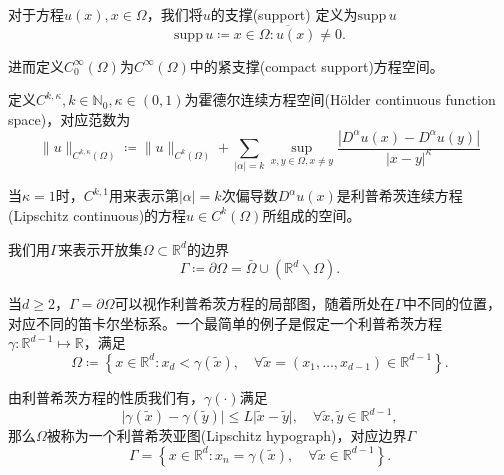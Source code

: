 对于方程$u(x), x \in \Omega$，我们将$u$的支撑(support) 定义为$\text{supp} \, u$
\begin{equation*}
  \text{supp} \, u \coloneqq \overline{x \in \Omega: u(x) \neq 0}.
\end{equation*}

进而定义$C_0^{\infty}(\Omega)$为$C^{\infty}(\Omega)$中的紧支撑(compact support)方程空间。

定义$C^{k,\kappa}, k \in \mathbb{N}_0, \kappa \in (0,1)$为霍德尔连续方程空间(Hölder continuous function space)，对应范数为
\begin{equation*}
  \| u \|_{C^{k,\kappa}(\Omega)} \coloneqq \| u \|_{C^{k}(\Omega)} + \sum_{\left| \alpha \right| = k} \sup_{x,y\in\Omega, x \neq y} \frac{\left| D^{\alpha}u(x)-D^{\alpha}u(y) \right|}{\left| x - y \right|^{\kappa}}
\end{equation*}

当$\kappa=1$时，$C^{k,1}$用来表示第$\left| \alpha \right|=k$次偏导数$D^{\alpha}u(x)$是利普希茨连续方程(Lipschitz continuous)的方程$u \in C^{k}(\Omega)$所组成的空间。

我们用$\Gamma$来表示开放集$\Omega \subset \mathbb{R}^d$的边界
\begin{equation*}
  \Gamma \coloneqq \partial \Omega = \bar{\Omega} \cup \left( \mathbb{R}^d \backslash \Omega \right).
\end{equation*}

当$d \ge 2$，$\Gamma = \partial \Omega$可以视作利普希茨方程的局部图，随着所处在$\Gamma$中不同的位置，对应不同的笛卡尔坐标系。一个最简单的例子是假定一个利普希茨方程$\gamma: \mathbb{R}^{d-1} \mapsto \mathbb{R}$，满足
\begin{equation*}
  \Omega \coloneqq \left\{
  x \in \mathbb{R}^d: x_d < \gamma(\tilde{x}), \quad \forall \tilde{x}=(x_1,\ldots,x_{d-1}) \in \mathbb{R}^{d-1}
  \right\}.
\end{equation*}

由利普希茨方程的性质我们有，$\gamma(\cdot)$满足
\begin{equation*}
  \big| \gamma(\tilde x) - \gamma (\tilde y) \big|
  \le L \big| \tilde{x} - \tilde{y} \big|, \quad \forall \tilde{x},\tilde{y} \in \mathbb{R}^{d-1},
\end{equation*}
那么$\Omega$被称为一个利普希茨亚图(Lipschitz hypograph)，对应边界$\Gamma$
\begin{equation*}
  \Gamma = \left\{
  x \in \mathbb{R}^d: x_n = \gamma(\tilde{x}), \quad \forall \tilde{x} \in \mathbb{R}^{d-1}
  \right\}.
\end{equation*}

